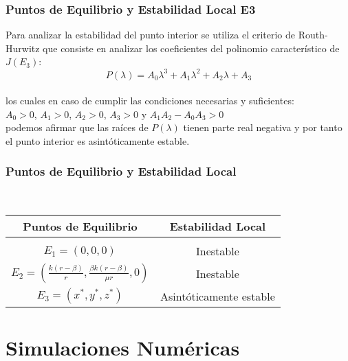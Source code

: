 \documentclass{beamer}
\begin{document}
\begin{frame}
	\frametitle{Puntos de Equilibrio y Estabilidad Local E3}
	\begin{minipage}{10cm}
		Para analizar la estabilidad del punto interior se utiliza el criterio de Routh-Hurwitz que consiste en analizar los coeficientes del polinomio característico de $J(E_3)$:\\
		$$P(\lambda) = A_0\lambda^3 + A_1\lambda^2 + A_2\lambda + A_3$$\\
		los cuales en caso de cumplir las condiciones necesarias y suficientes:\\
		$A_0 > 0$, $A_1 > 0$, $A_2 > 0$, $A_3 > 0$ y $A_1 A_2 - A_0 A_3 > 0$\\
		podemos afirmar que las raíces de $P(\lambda)$ tienen parte real negativa y por tanto el punto interior es asint\'oticamente estable.
		
		
		
	\end{minipage}
\end{frame}

\begin{frame}
	\frametitle{Puntos de Equilibrio y Estabilidad Local}
	\begin{minipage}{10cm}
		\

\begin{block}{}
	\begin{center}
	\begin{tabular}{|c|c|}
			\hline
		\textbf{Puntos de Equilibrio} & \textbf{Estabilidad Local}\\
		\hline
		\\
		\addlinespace[-2ex]
		$E_1=(0,0,0)$ & Inestable\\ \hline
		$E_2=(\frac{k(r-\beta)}{r}, \frac{\beta k(r-\beta)}{\mu r}, 0)$ & Inestable\\ \hline  
		$E_3 = (x^*,y^*,z^*)$ & Asint\'oticamente estable 
		 
	\end{tabular}
	\end{center}
\end{block}
	\end{minipage}
\end{frame}



\section{Simulaciones Num\'ericas}
\end{document}
